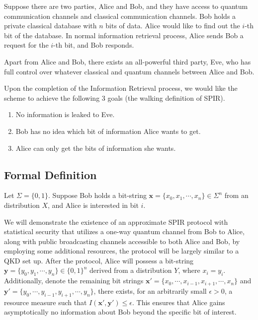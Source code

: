 \documentclass[%
 reprint,
superscriptaddress,
 amsmath,amssymb,
 aps,
]{revtex4-2}
\begin{document}
Suppose there are two parties, Alice and Bob, and they have access to quantum communication channels and classical communication channels. Bob holds a private classical database with $n$ bits of data. Alice would like to find out the $i$-th bit of the database. In normal information retrieval process, Alice sends Bob a request for the $i$-th bit, and Bob responds. 

Apart from Alice and Bob, there exists an all-powerful third party, Eve, who has full control over whatever classical and quantum channels between Alice and Bob.

Upon the completion of the Information Retrieval process, we would like the scheme to achieve the following 3 goals (the walking definition of SPIR).

\begin{enumerate}
    \item No information is leaked to Eve.

    \item Bob has no idea which bit of information Alice wants to get.

    \item Alice can only get the bits of information she wants.
\end{enumerate}

\subsection{Formal Definition}
\label{sec:formal_definition}

Let $\Sigma=\{0, 1\}$. Suppose Bob holds a bit-string $\textbf{x}=\{x_0, x_1, \cdots, x_n\}\in\Sigma^n$ from an distribution $X$, and Alice is interested in bit $i$. 

We will demonstrate the existence of an approximate SPIR protocol with statistical security that utilizes a one-way quantum channel from Bob to Alice, along with public broadcasting channels accessible to both Alice and Bob, by employing some additional resources, the protocol will be largely similar to a QKD set up. After the protocol, Alice will possess a bit-string \( \mathbf{y} = \{y_0, y_1, \cdots, y_n\} \in \{0, 1\}^n \) derived from a distribution \( Y \), where \( x_i = y_i \). Additionally, denote the remaining bit strings \( \mathbf{x'} = \{x_0, \cdots, x_{i-1}, x_{i+1}, \cdots, x_n\} \) and \( \mathbf{y'} = \{y_0, \cdots, y_{i-1}, y_{i+1}, \cdots, y_n\} \), there exists, for an arbitrarily small \( \epsilon > 0 \), a resource measure such that \( I(\mathbf{x'}, \mathbf{y'}) \le \epsilon \). This ensures that Alice gains asymptotically no information about Bob beyond the specific bit of interest.
\end{document}
